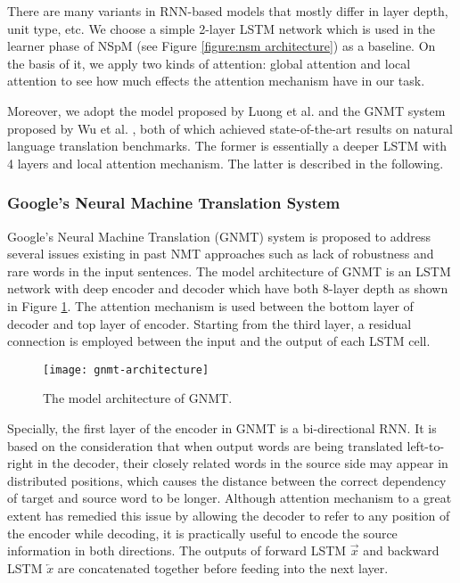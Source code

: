 There are many variants in RNN-based models that mostly differ in layer depth, unit type, etc. We choose a simple 2-layer LSTM network which is used in the learner phase of NSpM \cite{Soru2018a} (see Figure \ref{figure:nsm architecture}) as a baseline. On the basis of it, we apply two kinds of attention: global attention \cite{Bahdanau2014} and local attention \cite{Luong2015} to see how much effects the attention mechanism have in our task.

Moreover, we adopt the model proposed by Luong et al. \cite{Luong2015} and the GNMT system proposed by Wu et al. \cite{Wu2016}, both of which achieved state-of-the-art results on natural language translation benchmarks. The former is essentially a deeper LSTM with 4 layers and local attention mechanism. The latter is described in the following.

\subsubsection*{Google's Neural Machine Translation System}

Google's Neural Machine Translation (GNMT) system \cite{Wu2016} is proposed to address several issues existing in past NMT approaches such as lack of robustness and rare words in the input sentences. The model architecture of GNMT is an LSTM network with deep encoder and decoder which have both 8-layer depth as shown in Figure \ref{figure:gnmt architecture}. The attention mechanism is used between the bottom layer of decoder and top layer of encoder. Starting from the third layer, a residual connection is employed between the input and the output of each LSTM cell.

\begin{figure}[h]
\texttt{[image: gnmt-architecture]}
\centering
\caption{The model architecture of GNMT.}
\label{figure:gnmt architecture}
\end{figure}

Specially, the first layer of the encoder in GNMT is a bi-directional RNN. It is based on the consideration that when output words are being translated left-to-right in the decoder, their closely related words in the source side may appear in distributed positions, which causes the distance between the correct dependency of target and source word to be longer. Although attention mechanism to a great extent has remedied this issue by allowing the decoder to refer to any position of the encoder while decoding, it is practically useful to encode the source information in both directions. The outputs of forward LSTM $ \overrightarrow{x} $ and backward LSTM $ \overleftarrow{x} $ are concatenated together before feeding into the next layer.

